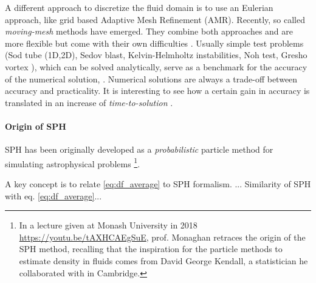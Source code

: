 A different approach to discretize the fluid domain is to use an Eulerian approach, like grid based Adaptive Mesh Refinement (AMR).
Recently, so called \emph{moving-mesh} methods have emerged. They combine both approaches and are more flexible but come with their own difficulties \citep{Springel2010, Shadowfax, Arepo}.
Usually simple test problems (Sod tube (1D,2D), Sedov blast, Kelvin-Helmholtz instabilities, Noh test, Gresho vortex \citet{Gresho1990}), %
which can be solved analytically, serve as a benchmark for the accuracy of the numerical solution, \citep[e.g. by measuring the distance of the two solution with an L2-norm in the whole domain, ][]{BorrowSphenix}.
Numerical solutions are always a trade-off between accuracy and practicality.
It is interesting to see how a certain gain in accuracy is translated in an increase of \emph{time-to-solution} \citep{Borrow2019}.

\paragraph{Origin of SPH}
SPH has been originally developed as a \emph{probabilistic} particle method for simulating astrophysical problems \citep{Lucy1977, Gingold1977}\footnote{In a lecture given at Monash University in 2018 \url{https://youtu.be/tAXHCAEgSuE}, prof. Monaghan retraces the origin of the SPH method, recalling that the inspiration for the particle methods to estimate density in fluids comes from David George Kendall, a statistician he collaborated with in Cambridge.}.

A key concept is to relate \eqref{eq:df_average} to SPH formalism.
... Similarity of SPH with eq. \eqref{eq:df_average}... %





